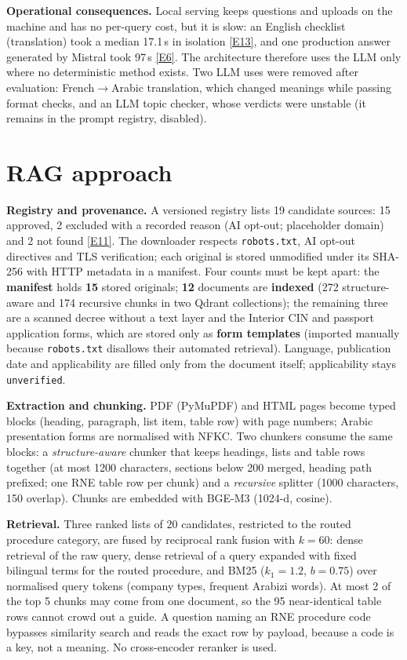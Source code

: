 \documentclass[10pt,a4paper]{article}
\newcommand{\code}[1]{\texttt{\small #1}}
\newcommand{\ev}[1]{\hyperref[app:evidence]{[#1]}}
\begin{document}
\textbf{Operational consequences.} Local serving keeps questions and uploads on the machine and has no
per-query cost, but it is slow: an English checklist (translation) took a median 17.1\,s in isolation
\ev{E13}, and one production answer generated by Mistral took 97\,s \ev{E6}. The architecture therefore uses
the LLM only where no deterministic method exists. Two LLM uses were removed after evaluation:
French$\rightarrow$Arabic translation, which changed meanings while passing format checks, and an LLM topic
checker, whose verdicts were unstable (it remains in the prompt registry, disabled).

\section{RAG approach}\label{sec:rag}
\textbf{Registry and provenance.} A versioned registry lists 19 candidate sources: 15 approved, 2 excluded
with a recorded reason (AI opt-out; placeholder domain) and 2 not found \ev{E11}. The downloader respects
\code{robots.txt}, AI opt-out directives and TLS verification; each original is stored unmodified under its
SHA-256 with HTTP metadata in a manifest. Four counts must be kept apart: the \textbf{manifest} holds
\textbf{15} stored originals; \textbf{12} documents are \textbf{indexed} (272 structure-aware and 174 recursive
chunks in two Qdrant collections); the remaining three are a scanned decree without a text layer and the
Interior CIN and passport application forms, which are stored only as \textbf{form templates} (imported
manually because \code{robots.txt} disallows their automated retrieval). Language, publication date and
applicability are filled only from the document itself; applicability stays \code{unverified}.

\textbf{Extraction and chunking.} PDF (PyMuPDF) and HTML pages become typed blocks (heading, paragraph, list
item, table row) with page numbers; Arabic presentation forms are normalised with NFKC. Two chunkers consume
the same blocks: a \emph{structure-aware} chunker that keeps headings, lists and table rows together (at most
1200 characters, sections below 200 merged, heading path prefixed; one RNE table row per chunk) and a
\emph{recursive} splitter (1000 characters, 150 overlap). Chunks are embedded with BGE-M3 (1024-d, cosine).

\textbf{Retrieval.} Three ranked lists of 20 candidates, restricted to the routed procedure category, are fused
by reciprocal rank fusion \cite{cormack2009rrf} with $k=60$: dense retrieval of the raw query, dense retrieval
of a query expanded with fixed bilingual terms for the routed procedure, and BM25 \cite{robertson2009bm25}
($k_1=1.2$, $b=0.75$) over normalised query tokens (company types, frequent Arabizi words). At most 2 of the
top 5 chunks may come from one document, so the 95 near-identical table rows cannot crowd out a guide. A
question naming an RNE procedure code bypasses similarity search and reads the exact row by payload, because a
code is a key, not a meaning. No cross-encoder reranker is used.
\end{document}
